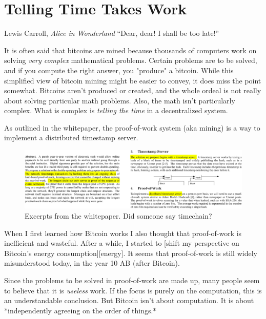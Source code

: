 \chapter{ Telling Time Takes Work}
\label{les:17}

\begin{chapquote}{Lewis Carroll, \textit{Alice in Wonderland}}
``Dear, dear! I shall be too late!''
\end{chapquote}

It is often said that bitcoins are mined because thousands of computers
work on solving \textit{very complex} mathematical problems. Certain problems
are to be solved, and if you compute the right answer, you "produce" a
bitcoin. While this simplified view of bitcoin mining might be easier to
convey, it does miss the point somewhat. Bitcoins aren't produced or
created, and the whole ordeal is not really about solving particular
math problems. Also, the math isn't particularly complex. What is
complex is \textit{telling the time} in a decentralized system.

As outlined in the whitepaper, the proof-of-work system (aka mining) is
a way to implement a distributed timestamp server.

\begin{figure}
  \includegraphics{assets/images/bitcoin-whitepaper-timestamp-wide.png}
  \caption{Excerpts from the whitepaper. Did someone say timechain?}
  \label{fig:bitcoin-whitepaper-timestamp-wide}
\end{figure}

When I first learned how Bitcoin works I also thought that proof-of-work
is inefficient and wasteful. After a while, I started to [shift my
perspective on Bitcoin's energy consumption][energy]. It seems that
proof-of-work is still widely misunderstood today, in the year 10 AB
(after Bitcoin).

Since the problems to be solved in proof-of-work are made up, many
people seem to believe that it is \textit{useless} work. If the focus is purely
on the computation, this is an understandable conclusion. But Bitcoin
isn't about computation. It is about *independently agreeing on the
order of things.*

